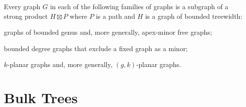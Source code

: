 \documentclass[10pt, conference, compsocconf]{IEEEtran}
\begin{document}
\begin{thm}
   Every graph $G$ in each of the following families of graphs is a subgraph of a
strong product $H\boxtimes P$ where $P$ is a path and $H$ is a graph of bounded
treewidth:

   \begin{compactitem}
   \item graphs of bounded genus and, more generally, apex-minor free graphs;%
     \item bounded degree graphs that exclude a fixed graph as
a minor;%
   \item $k$-planar graphs and, more generally, $(g,k)$-planar graphs. %
 \end{compactitem}
\end{thm}





\section{Bulk Trees}
\end{document}
